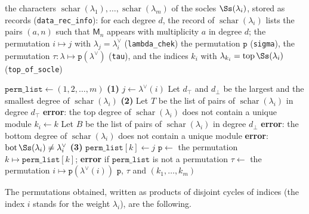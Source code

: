\begin{algorithm}[H]
\caption{Weights permutation $\mathtt{p}$ and $\tau$ from the socle characters}
\label{alg:weights_permutation}
\begin{algorithmic}[1]
\Require the characters $\operatorname{schar}(\lambda_1),\dots,\operatorname{schar}(\lambda_m)$ of the socles $\Ss(\lambda_i)$, stored as records (\texttt{data\_rec\_info}): for each degree $d$, the record of $\operatorname{schar}(\lambda_i)$ lists the pairs $(a,n)$ such that $\mathsf{M}_n$ appears with multiplicity $a$ in degree $d$;
         the permutation $i\mapsto j$ with $\lambda_j=\lambda_i^\vee$ (\texttt{lambda\_chek})
\Ensure the permutation $\mathtt{p}$ (\texttt{sigma}), the permutation $\tau\colon\lambda\mapsto\mathtt{p}(\lambda^\vee)$ (\texttt{tau}),
        and the indices $k_i$ with $\lambda_{k_i}=\operatorname{top}\Ss(\lambda_i)$ (\texttt{top\_of\_socle})

\State $\mathtt{perm\_list}\gets(1,2,\dots,m)$
  \State \textbf{(1)} $j\gets\lambda^\vee(i)$ 
  \State Let $d_\top$ and $d_\bot$ be the largest and the smallest degree of $\operatorname{schar}(\lambda_i)$
  \State \textbf{(2)} Let $T$ be the list of pairs of $\operatorname{schar}(\lambda_i)$ in degree $d_\top$
    \State \textbf{error}: the top degree of $\operatorname{schar}(\lambda_i)$ does not contain a unique module
  \EndIf
  \State $k_i\gets k$ 
  \State Let $B$ be the list of pairs of $\operatorname{schar}(\lambda_i)$ in degree $d_\bot$
    \State \textbf{error}: the bottom degree of $\operatorname{schar}(\lambda_i)$ does not contain a unique module
  \EndIf
   
    \State \textbf{error}: $\operatorname{bot}\Ss(\lambda_i)\neq\lambda_i^\vee$
  \EndIf
  \State \textbf{(3)} $\mathtt{perm\_list}[k]\gets j$ 
\EndFor
\State $\mathtt{p}\gets$ the permutation $k\mapsto\mathtt{perm\_list}[k]$; \textbf{error} if $\mathtt{perm\_list}$ is not a permutation
\State $\tau\gets$ the permutation $i\mapsto\mathtt{p}(\lambda^\vee(i))$
\State \Return $\mathtt{p}$, $\tau$ and $(k_1,\dots,k_m)$
\end{algorithmic}
\end{algorithm}

The permutations obtained, written as products of disjoint cycles of indices (the index $i$ stands for the weight $\lambda_i$), are the following.

